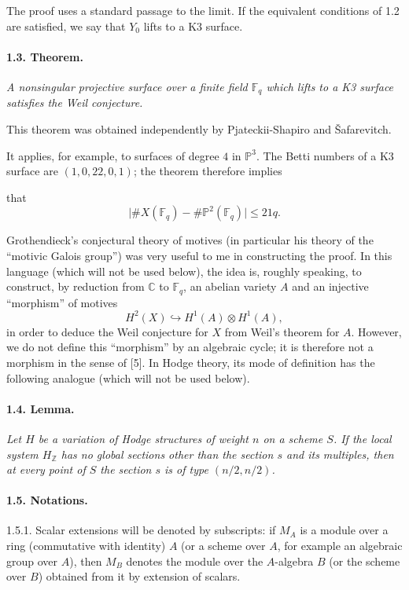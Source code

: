 \documentclass[10pt,leqno]{article}
\newcommand{\C}{\mathbb{C}}
\newcommand{\Z}{\mathbb{Z}}
\newcommand{\Fp}{\mathbb{F}_q}
\newcommand{\into}{\hookrightarrow}
\begin{document}
The proof uses a standard passage to the limit. If the equivalent conditions of 1.2 are satisfied, we say that $Y_0$ lifts to a K3 surface.

\paragraph{1.3. Theorem.} \emph{A nonsingular projective surface over a finite field $\Fp$ which lifts to a K3 surface satisfies the Weil conjecture.}

This theorem was obtained independently by Pjateckii-Shapiro and \v{S}afarevitch.

It applies, for example, to surfaces of degree $4$ in $\mathbb P^3$. The Betti numbers of a K3 surface are $(1,0,22,0,1)$; the theorem therefore implies

\clearpage

that
\[
\bigl|\#X(\Fp)-\#\mathbb P^2(\Fp)\bigr|\le 21q.
\]

Grothendieck's conjectural theory of motives (in particular his theory of the ``motivic Galois group'') was very useful to me in constructing the proof. In this language (which will not be used below), the idea is, roughly speaking, to construct, by reduction from $\C$ to $\Fp$, an abelian variety $A$ and an injective ``morphism'' of motives
\[
H^2(X)\into H^1(A)\otimes H^1(A),
\]
in order to deduce the Weil conjecture for $X$ from Weil's theorem for $A$. However, we do not define this ``morphism'' by an algebraic cycle; it is therefore not a morphism in the sense of [5]. In Hodge theory, its mode of definition has the following analogue (which will not be used below).

\paragraph{1.4. Lemma.} \emph{Let $H$ be a variation of Hodge structures of weight $n$ on a scheme $S$. If the local system $H_\Z$ has no global sections other than the section $s$ and its multiples, then at every point of $S$ the section $s$ is of type $(n/2,n/2)$.}

\paragraph{1.5. Notations.} 1.5.1. Scalar extensions will be denoted by subscripts: if $M_A$ is a module over a ring (commutative with identity) $A$ (or a scheme over $A$, for example an algebraic group over $A$), then $M_B$ denotes the module over the $A$-algebra $B$ (or the scheme over $B$) obtained from it by extension of scalars.
\end{document}
